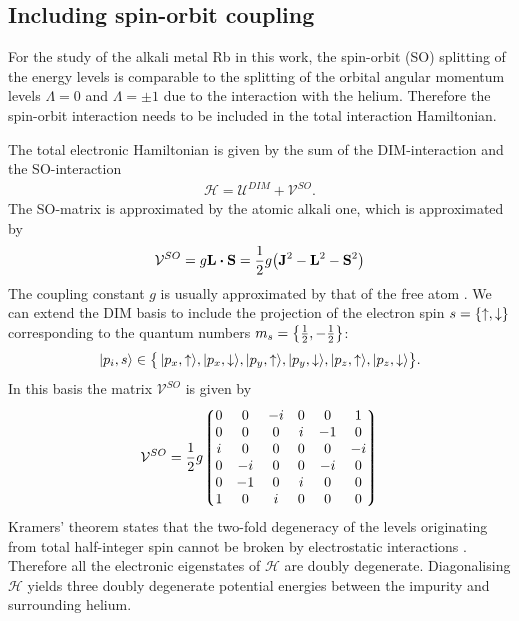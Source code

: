 		\subsection{Including spin-orbit coupling}
			For the study of the alkali metal Rb in this work, the spin-orbit (SO) splitting of the energy levels is comparable to the splitting of the orbital angular momentum levels $\Lambda=0$ and $\Lambda=\pm 1$ due to the interaction with the helium. Therefore the spin-orbit interaction needs to be included in the total interaction Hamiltonian.
			
			The total electronic Hamiltonian is given by the sum of the DIM-interaction and the SO-interaction
			\begin{align}
				\mathcal{H} = \mathcal{U}^{DIM}+\mathcal{V}^{SO}.
			\end{align}
			The SO-matrix is approximated by the atomic alkali one, which is approximated by
			\begin{align}
				\mathcal{V}^{SO}=g\vec{L}\vdot\vec{S} = \frac{1}{2}g\qty(\vec{J}^2-\vec{L}^2-\vec{S}^2)
			\end{align}
			The coupling constant $g$ is usually approximated by that of the free atom \cite{Jak97}. We can extend the DIM basis  to include the projection of the electron spin $s=\qty{\uparrow,\downarrow}$ corresponding to the quantum numbers $m_s=\qty{\frac{1}{2},-\frac{1}{2}}$:
			\begin{align}
				\ket{p_i,s}\in\qty\big{\,\ket{p_x,\uparrow}\!,\ket{p_x,\downarrow}\!,\ket{p_y,\uparrow}\!,\ket{p_y,\downarrow}\!,\ket{p_z,\uparrow}\!,\ket{p_z,\downarrow}}.
			\end{align}
			In this basis the matrix $\mathcal{V}^{SO}$ is given by
			\begin{align}
				\mathcal{V}^{SO} = \frac{1}{2}g\mqty*(0&0&-i&0&0&1\\0&0&0&i&-1&0\\i&0&0&0&0&-i\\0&-i&0&0&-i&0\\0&-1&0&i&0&0\\1&0&i&0&0&0)
			\end{align}
			Kramers' theorem states that the two-fold degeneracy of the levels originating from total half-integer spin cannot be broken by electrostatic interactions \cite{Nak01}. Therefore all the electronic eigenstates of $\mathcal{H}$ are doubly degenerate. Diagonalising $\mathcal{H}$ yields three doubly degenerate potential energies between the impurity and surrounding helium.
			

